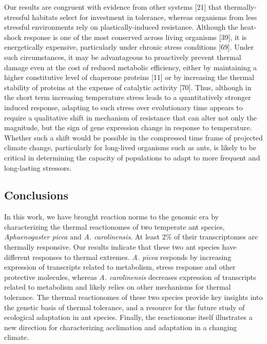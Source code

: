 \documentclass[]{article}
\begin{document}
Our results are congruent with evidence from other systems {[}21{]} that
thermally-stressful habitats select for investment in tolerance, whereas
organisms from less stressful environments rely on plastically-induced
resistance. Although the heat-shock response is one of the most
conserved across living organisms {[}39{]}, it is energetically
expensive, particularly under chronic stress conditions {[}69{]}. Under
such circumstances, it may be advantageous to proactively prevent
thermal damage even at the cost of reduced metabolic efficiency, either
by maintaining a higher constitutive level of chaperone proteins
{[}11{]} or by increasing the thermal stability of proteins at the
expense of catalytic activity {[}70{]}. Thus, although in the short term
increasing temperature stress leads to a quantitatively stronger induced
response, adapting to such stress over evolutionary time appears to
require a qualitative shift in mechanism of resistance that can alter
not only the magnitude, but the sign of gene expression change in
response to temperature. Whether such a shift would be possible in the
compressed time frame of projected climate change, particularly for
long-lived organisms such as ants, is likely to be critical in
determining the capacity of populations to adapt to more frequent and
long-lasting stressors.

\subsection{Conclusions}\label{conclusions}

In this work, we have brought reaction norms to the genomic era by
characterizing the thermal reactionomes of two temperate ant species,
\emph{Aphaenogaster picea} and \emph{A. carolinensis}. At least 2\% of
their transcriptomes are thermally responsive. Our results indicate that
these two ant species have different responses to thermal extremes.
\emph{A. picea} responds by increasing expression of transcripts related
to metabolism, stress response and other protective molecules, whereas
\emph{A. carolinensis} decreases expression of transcripts related to
metabolism and likely relies on other mechanisms for thermal tolerance.
The thermal reactionomes of these two species provide key insights into
the genetic basis of thermal tolerance, and a resource for the future
study of ecological adaptation in ant species. Finally, the reactionome
itself illustrates a new direction for characterizing acclimation and
adaptation in a changing climate.
\end{document}
